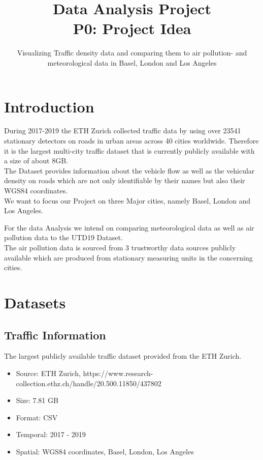 \documentclass{article}
\title        {Data Analysis Project\\P0: Project Idea}
\subtitle     {Visualizing Traffic density data and comparing them to air pollution- and meteorological data in Basel, London and Los Angeles}
\begin{document}
\printfront

\section{Introduction}

During 2017-2019 the ETH Zurich collected traffic data by using over 23541 stationary detectors on roads in urban areas across 40 cities worldwide. Therefore it is the largest multi-city traffic dataset that is currently publicly available with a size of about 8GB.\\

The Dataset provides information about the vehicle flow as well as the vehicular density on roads which are not only identifiable by their names but also their WGS84 coordinates.\\

We want to focus our Project on three Major cities, namely Basel, London and Los Angeles.

For the data Analysis we intend on comparing meteorological data as well as air pollution data to the UTD19 Dataset.\\

The air pollution data is sourced from 3 trustworthy data sources publicly available which are produced from stationary measuring units in the concerning cities.

\section{Datasets}

\subsection{Traffic Information}

The largest publicly available traffic dataset provided from the ETH Zurich.

\begin{itemize}
	\item Source: ETH Zurich, https://www.research-collection.ethz.ch/handle/20.500.11850/437802
	\item Size: 7.81 GB
	\item Format: CSV
	\item Temporal: 2017 - 2019
	\item Spatial: WGS84 coordinates, Basel, London, Los Angeles
\end{itemize}
\end{document}

